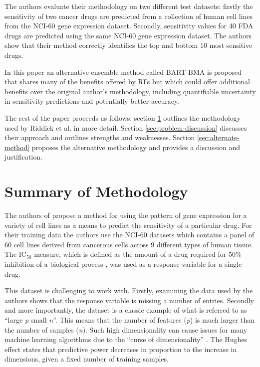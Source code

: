 \documentclass[journal]{IEEEtran}
\begin{document}
The authors evaluate their methodology on two different test datasets: firstly the sensitivity of two cancer drugs are predicted from a collection of human cell lines from the NCI-60 gene expression dataset. Secondly, sensitivity values for 40 FDA drugs are predicted using the same NCI-60 gene expression dataset. The authors show that their method correctly identifies the top and bottom 10 most sensitive drugs. 

In this paper an alternative ensemble method called BART-BMA is proposed that shares many of the benefits offered by RFs but which could offer additional benefits over the original author's methodology, including quantifiable uncertainty in sensitivity predictions and potentially better accuracy. 

The rest of the paper proceeds as follows: section \ref{sec:original-methodology} outlines the methodology used by Riddick et al. in more detail. Section \ref{sec:problem-discussion} discusses their approach and outlines strengths and weaknesses. Section \ref{sec:alternate-method} proposes the alternative methodology and provides a discussion and justification.

\section{Summary of Methodology}
\label{sec:original-methodology}

The authors of \cite{riddick2011predicting} propose a method for using the pattern of gene expression for a variety of cell lines as a means to predict the sensitivity of a particular drug. For their training data the authors use the NCI-60 datasets which contains a panel of 60 cell lines derived from cancerous cells across 9 different types of human tissue. The IC$_{50}$ measure, which is defined as the amount of a drug required for 50\% inhibition of a biological process \cite{FDA-IC50}, was used as a response variable for a single drug.

This dataset is challenging to work with. Firstly, examining the data used by the authors shows that the response variable is missing a number of entries. Secondly and more importantly, the dataset is a classic example of what is referred to as ``large \textit{p} small \textit{n}''. This means that the number of features (\textit{p}) is much larger than the number of samples (\textit{n}). Such high dimensionality can cause issues for many machine learning algorithms due to the ``curse of dimensionality'' \cite{bellman1957dynamic}. The Hughes effect \cite{hughes1968mean} states that predictive power decreases in proportion to the increase in dimensions, given a fixed number of training samples.
\end{document}
